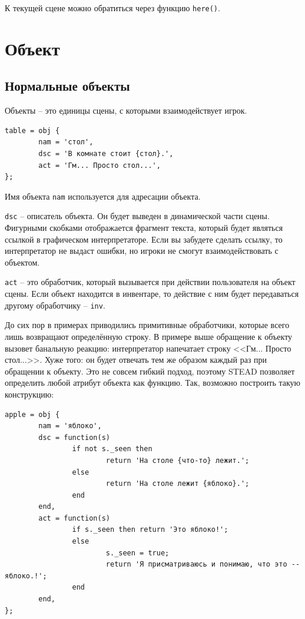 \documentclass[a4paper,12pt]{article}
\begin{document}
К текущей сцене можно обратиться через функцию \verb/here()/.

\section{Объект}
\subsection{Нормальные объекты}
Объекты -- это единицы сцены, с которыми взаимодействует игрок.

\begin{verbatim}
table = obj {
        nam = 'стол',
        dsc = 'В комнате стоит {стол}.',
        act = 'Гм... Просто стол...',
};
\end{verbatim}

Имя объекта \verb/nam/ используется для адресации объекта.

\verb/dsc/ -- описатель объекта. Он будет выведен в динамической части сцены. Фигурными скобками отображается фрагмент текста, который будет являться ссылкой в графическом интерпретаторе. Если вы забудете сделать ссылку, то интерпретатор не выдаст ошибки, но игроки не смогут взаимодействовать с объектом.

\verb/act/ -- это обработчик, который вызывается при действии пользователя на объект сцены. Если объект находится в инвентаре, то действие с ним будет передаваться другому обработчику -- \verb/inv/.

До сих пор в примерах приводились примитивные обработчики, которые всего лишь возвращают определённую строку. В примере выше обращение к объекту вызовет банальную реакцию: интерпретатор напечатает строку <<Гм... Просто стол...>>. Хуже того: он будет отвечать тем же образом каждый раз при обращении к объекту. Это не совсем гибкий подход, поэтому STEAD позволяет определить любой атрибут объекта как функцию. Так, возможно построить такую конструкцию:

\begin{verbatim}
apple = obj {
        nam = 'яблоко',
        dsc = function(s)
                if not s._seen then
                        return 'На столе {что-то} лежит.';
                else
                        return 'На столе лежит {яблоко}.';
                end
        end,
        act = function(s)
                if s._seen then return 'Это яблоко!';
                else
                        s._seen = true;
                        return 'Я присматриваюсь и понимаю, что это -- яблоко.!';
                end
        end,
};
\end{verbatim}
\end{document}
